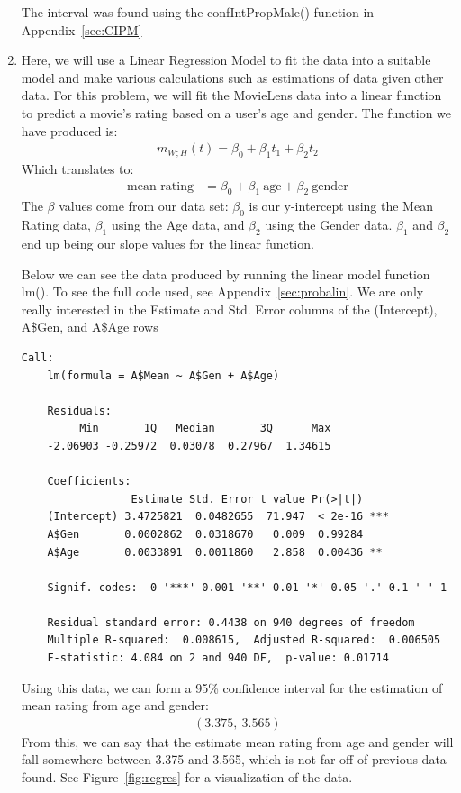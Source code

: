 \documentclass[11pt]{article}  %
\begin{document}
\begin{enumerate}
    The interval was found using the confIntPropMale() function in Appendix~\ref{sec:CIPM}

    \item Here, we will use a Linear Regression Model to fit the data into a suitable model and make various calculations such as estimations of data given other data. For this problem, we will fit the MovieLens data into a linear function to predict a movie's rating based on a user's age and gender. The function we have produced is:
    \begin{align*}
        m_{W;H}(t) = \beta_0 + \beta_1 t_1 + \beta_2 t_2
    \end{align*}
    Which translates to:
    \begin{align*}
        \text{mean rating} &= \beta_0 + \beta_1\ \text{age} + \beta_2\ \text{gender}
    \end{align*}
    The $\beta$ values come from our data set: $\beta_0$ is our y-intercept using the Mean Rating data, $\beta_1$ using the Age data, and $\beta_2$  using the Gender data. $\beta_1$ and $\beta_2$ end up being our slope values for the linear function.
    
    Below we can see the data produced by running the linear model function lm(). To see the full code used, see Appendix~\ref{sec:probalin}. We are only really interested in the Estimate and Std. Error columns of the (Intercept), A\$Gen, and A\$Age rows
    \begin{lstlisting}[basicstyle=\small]
    Call:
    lm(formula = A$Mean ~ A$Gen + A$Age)
    
    Residuals:
         Min       1Q   Median       3Q      Max 
    -2.06903 -0.25972  0.03078  0.27967  1.34615 
    
    Coefficients:
                 Estimate Std. Error t value Pr(>|t|)    
    (Intercept) 3.4725821  0.0482655  71.947  < 2e-16 ***
    A$Gen       0.0002862  0.0318670   0.009  0.99284    
    A$Age       0.0033891  0.0011860   2.858  0.00436 ** 
    ---
    Signif. codes:  0 '***' 0.001 '**' 0.01 '*' 0.05 '.' 0.1 ' ' 1

    Residual standard error: 0.4438 on 940 degrees of freedom
    Multiple R-squared:  0.008615,	Adjusted R-squared:  0.006505 
    F-statistic: 4.084 on 2 and 940 DF,  p-value: 0.01714
    \end{lstlisting}
    Using this data, we can form a 95\% confidence interval for the estimation of mean rating from age and gender:
    \begin{align*}
        (3.375,\ 3.565)
    \end{align*}
    From this, we can say that the estimate mean rating from age and gender will fall somewhere between 3.375 and 3.565, which is not far off of previous data found. See Figure~\ref{fig:regres} for a visualization of the data.
    

\end{enumerate}
\end{document}
